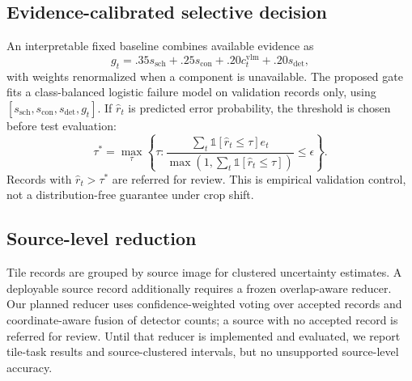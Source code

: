 \subsection{Evidence-calibrated selective decision}
An interpretable fixed baseline combines available evidence as
\begin{equation}
g_t=.35s_{\mathrm{sch}}+.25s_{\mathrm{con}}+.20c_t^{\mathrm{vlm}}+.20s_{\mathrm{det}},
\label{eq:fixedgate}
\end{equation}
with weights renormalized when a component is unavailable. The proposed gate fits a class-balanced logistic failure model on validation records only, using $[s_{\mathrm{sch}},s_{\mathrm{con}},s_{\mathrm{det}},g_t]$. If $\hat r_t$ is predicted error probability, the threshold is chosen before test evaluation:
\begin{equation}
\tau^*=\max_{\tau}\left\{\tau:
\frac{\sum_t\mathbb{1}[\hat r_t\le\tau]e_t}
{\max(1,\sum_t\mathbb{1}[\hat r_t\le\tau])}\le\epsilon\right\}.
\label{eq:threshold}
\end{equation}
Records with $\hat r_t>\tau^*$ are referred for review. This is empirical validation control, not a distribution-free guarantee under crop shift.

\subsection{Source-level reduction}
Tile records are grouped by source image for clustered uncertainty estimates. A deployable source record additionally requires a frozen overlap-aware reducer. Our planned reducer uses confidence-weighted voting over accepted records and coordinate-aware fusion of detector counts; a source with no accepted record is referred for review. Until that reducer is implemented and evaluated, we report tile-task results and source-clustered intervals, but no unsupported source-level accuracy.
